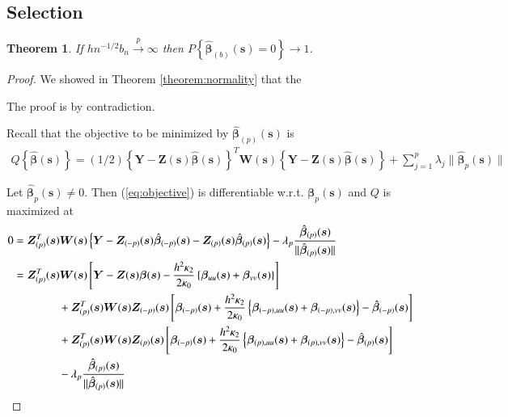 \documentclass[authoryear, review, 11pt]{elsarticle}
\newtheorem{theorem}{Theorem}[section]
\begin{document}
    \subsection{Selection}
    
        \begin{theorem} \label{theorem:selection}   
            If $h n^{-1/2} b_n \xrightarrow{p} \infty$ then $P \left\{ \hat{\bm{\beta}}_{(b)} (\bm{s}) = 0 \right\} \to 1$.
        \end{theorem}

        \begin{proof}
            We showed in Theorem \ref{theorem:normality} that the 
            
            The proof is by contradiction.
      
            Recall that the objective to be minimized by $\hat{\bm{\beta}}_{(p)} (\bm{s})$ is
            \begin{align}\label{eq:objective}
                Q \left\{ \hat{\bm{\beta}} (\bm{s}) \right\} = (1/2) \left\{ \bm{Y} - \bm{Z}(\bm{s}) \hat{\bm{\beta}} (\bm{s}) \right\}^T \bm{W}(\bm{s}) \left\{ \bm{Y} - \bm{Z}(\bm{s}) \hat{\bm{\beta}} (\bm{s}) \right\} + \sum_{j=1}^p \lambda_j \| \hat{\bm{\beta}}_p (\bm{s}) \|
            \end{align}

            Let $\hat{\bm{\beta}}_p(\bm{s}) \ne 0$. Then (\ref{eq:objective}) is differentiable w.r.t. $\bm{\beta}_p(\bm{s})$ and $Q$ is maximized at
            \begin{align}
                0 &= \bm{Z}_{(p)}^T(\bm{s}) \bm{W}(\bm{s}) \left\{ \bm{Y} - \bm{Z}_{(-p)}(\bm{s}) \hat{\bm{\beta}}_{(-p)}(\bm{s}) - \bm{Z}_{(p)}(\bm{s}) \hat{\bm{\beta}}_{(p)}(\bm{s}) \right\} - \lambda_p \frac{ \hat{\bm{\beta}}_{(p)}(\bm{s}) }{\| \hat{\bm{\beta}}_{(p)}(\bm{s}) \|} \notag \\
                &= \bm{Z}_{(p)}^T(\bm{s}) \bm{W}(\bm{s}) \left[ \bm{Y} - \bm{Z}(\bm{s}) \bm{\beta}(\bm{s}) - \frac{h^2 \kappa_2}{2 \kappa_0} \left\{ \bm{\beta}_{uu}(\bm{s}) + \bm{\beta}_{vv}(\bm{s}) \right\} \right] \notag \\
                &\mkern+72mu+ \bm{Z}_{(p)}^T(\bm{s}) \bm{W}(\bm{s}) \bm{Z}_{(-p)}(\bm{s}) \left[ \bm{\beta}_{(-p)}(\bm{s}) + \frac{h^2 \kappa_2}{2 \kappa_0} \left\{ \bm{\beta}_{(-p),uu}(\bm{s}) + \bm{\beta}_{(-p),vv}(\bm{s}) \right\} - \hat{\bm{\beta}}_{(-p)}(\bm{s}) \right] \notag \\
                &\mkern+72mu+ \bm{Z}_{(p)}^T(\bm{s}) \bm{W}(\bm{s}) \bm{Z}_{(p)}(\bm{s}) \left[ \bm{\beta}_{(-p)}(\bm{s}) + \frac{h^2 \kappa_2}{2 \kappa_0} \left\{ \bm{\beta}_{(p),uu}(\bm{s}) + \bm{\beta}_{(p),vv}(\bm{s}) \right\} - \hat{\bm{\beta}}_{(p)}(\bm{s}) \right]  \notag \\
                &\mkern+72mu- \lambda_p \frac{ \hat{\bm{\beta}}_{(p)}(\bm{s}) }{\| \hat{\bm{\beta}}_{(p)}(\bm{s}) \|} \notag \\
            \end{align}
        

\end{proof}
\end{document}
